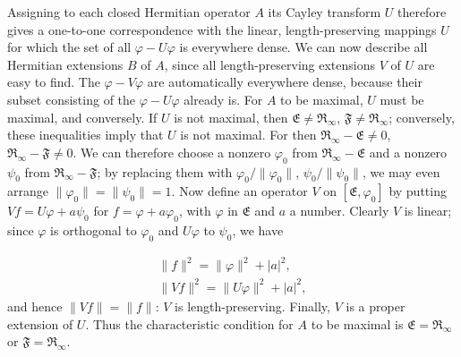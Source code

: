 \documentclass[fontsize=13pt,twoside,openany,headings=normal,parskip=false,bookmarkpackage=false,DIV=calc]{scrbook}
\begin{document}
Assigning to each closed Hermitian operator $A$ its Cayley transform $U$ therefore gives a one-to-one correspondence with the linear, length-preserving mappings $U$ for which the set of all $\varphi-U\varphi$ is everywhere dense. We can now describe all Hermitian extensions $B$ of $A$, since all length-preserving extensions $V$ of $U$ are easy to find. The $\varphi-V\varphi$ are automatically everywhere dense, because their subset consisting of the $\varphi-U\varphi$ already is. For $A$ to be maximal, $U$ must be maximal, and conversely. If $U$ is not maximal, then $\mathfrak E\ne\mathfrak R_\infty$, $\mathfrak F\ne\mathfrak R_\infty$; conversely, these inequalities imply that $U$ is not maximal. For then $\mathfrak R_\infty-\mathfrak E\ne0$, $\mathfrak R_\infty-\mathfrak F\ne0$. We can therefore choose a nonzero $\varphi_0$ from $\mathfrak R_\infty-\mathfrak E$ and a nonzero $\psi_0$ from $\mathfrak R_\infty-\mathfrak F$; by replacing them with $\varphi_0/\|\varphi_0\|$, $\psi_0/\|\psi_0\|$, we may even arrange $\|\varphi_0\|=\|\psi_0\|=1$. Now define an operator $V$ on $[\mathfrak E,\varphi_0]$ by putting $Vf=U\varphi+a\psi_0$ for $f=\varphi+a\varphi_0$, with $\varphi$ in $\mathfrak E$ and $a$ a number. Clearly $V$ is linear; since $\varphi$ is orthogonal to $\varphi_0$ and $U\varphi$ to $\psi_0$, we have

\hypertarget{origpage-87}{}%
\begin{gather*}
\|f\|^2=\|\varphi\|^2+|a|^2,\\
\|Vf\|^2=\|U\varphi\|^2+|a|^2,
\end{gather*}
and hence $\|Vf\|=\|f\|$: $V$ is length-preserving. Finally, $V$ is a proper extension of $U$. Thus the characteristic condition for $A$ to be maximal is $\mathfrak E=\mathfrak R_\infty$ or $\mathfrak F=\mathfrak R_\infty$.
\end{document}
